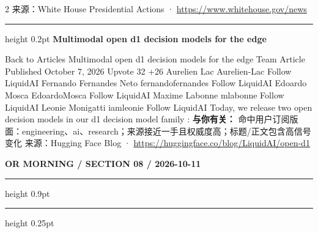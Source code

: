 \documentclass[10.5pt]{ctexart}
\begin{document}
\begin{multicols}{2}
{\footnotesize\color{ormuted} 来源：White House Presidential Actions · \url{https://www.whitehouse.gov/news}}
\vspace{2mm}
\hrule height 0.2pt
\vspace{2mm}
{\large\bfseries Multimodal open d1 decision models for the edge}\par
Back to Articles Multimodal open d1 decision models for the edge Team Article Published October 7, 2026 Upvote 32 +26 Aurelien Lac Aurelien-Lac Follow LiquidAI Fernando Fernandes Neto fernandofernandes Follow LiquidAI Edoardo Mosca EdoardoMosca Follow LiquidAI Maxime Labonne mlabonne Follow LiquidAI Leonie Monigatti iamleonie Follow LiquidAI Today, we release two open decision models in our d1 decision model family :
\textbf{与你有关：} 命中用户订阅版面：engineering、ai、research；来源接近一手且权威度高；标题/正文包含高信号变化
{\footnotesize\color{ormuted} 来源：Hugging Face Blog · \url{https://huggingface.co/blog/LiquidAI/open-d1}}
\end{multicols}
\newpage
{\small\bfseries OR MORNING / SECTION 08 / 2026-10-11}
\vspace{2mm}
\hrule height 0.9pt
\vspace{1.5mm}
\hrule height 0.25pt
\vspace{4mm}
\end{document}
